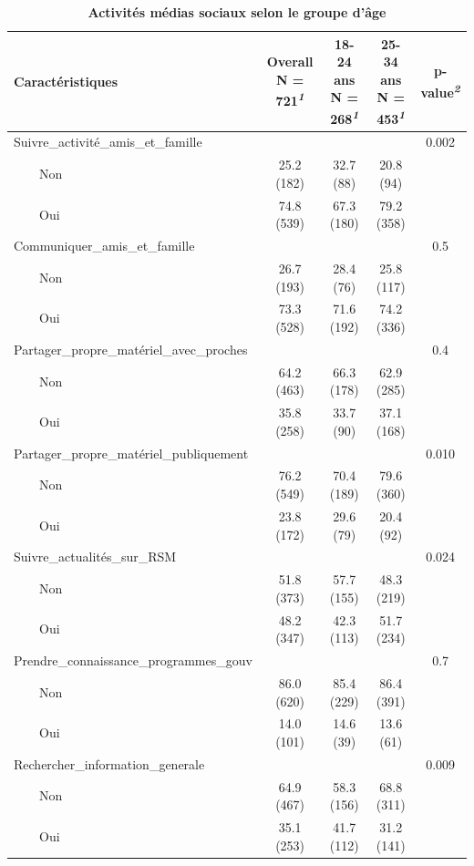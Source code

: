 \documentclass[
]{article}
\begin{document}
\newpage
\begin{table}[!t]
\caption{\label{tab:unnamed-chunk-11}\textbf{Activités médias sociaux selon le groupe d'âge}} 
\fontsize{12.0pt}{14.4pt}\selectfont
\begin{tabular*}{\linewidth}{@{\extracolsep{\fill}}lcccc}
\toprule
\textbf{Caractéristiques} & \textbf{Overall}  N = 721\textsuperscript{\textit{1}} & \textbf{18-24 ans}  N = 268\textsuperscript{\textit{1}} & \textbf{25-34 ans}  N = 453\textsuperscript{\textit{1}} & \textbf{p-value}\textsuperscript{\textit{2}} \\ 
\midrule\addlinespace[2.5pt]
Suivre\_activité\_amis\_et\_famille &  &  &  & 0.002 \\ 
    Non & 25.2 (182) & 32.7 (88) & 20.8 (94) &  \\ 
    Oui & 74.8 (539) & 67.3 (180) & 79.2 (358) &  \\ 
Communiquer\_amis\_et\_famille &  &  &  & 0.5 \\ 
    Non & 26.7 (193) & 28.4 (76) & 25.8 (117) &  \\ 
    Oui & 73.3 (528) & 71.6 (192) & 74.2 (336) &  \\ 
Partager\_propre\_matériel\_avec\_proches &  &  &  & 0.4 \\ 
    Non & 64.2 (463) & 66.3 (178) & 62.9 (285) &  \\ 
    Oui & 35.8 (258) & 33.7 (90) & 37.1 (168) &  \\ 
Partager\_propre\_matériel\_publiquement &  &  &  & 0.010 \\ 
    Non & 76.2 (549) & 70.4 (189) & 79.6 (360) &  \\ 
    Oui & 23.8 (172) & 29.6 (79) & 20.4 (92) &  \\ 
Suivre\_actualités\_sur\_RSM &  &  &  & 0.024 \\ 
    Non & 51.8 (373) & 57.7 (155) & 48.3 (219) &  \\ 
    Oui & 48.2 (347) & 42.3 (113) & 51.7 (234) &  \\ 
Prendre\_connaissance\_programmes\_gouv &  &  &  & 0.7 \\ 
    Non & 86.0 (620) & 85.4 (229) & 86.4 (391) &  \\ 
    Oui & 14.0 (101) & 14.6 (39) & 13.6 (61) &  \\ 
Rechercher\_information\_generale &  &  &  & 0.009 \\ 
    Non & 64.9 (467) & 58.3 (156) & 68.8 (311) &  \\ 
    Oui & 35.1 (253) & 41.7 (112) & 31.2 (141) &  \\ 

\end{tabular*}
\end{table}
\end{document}

